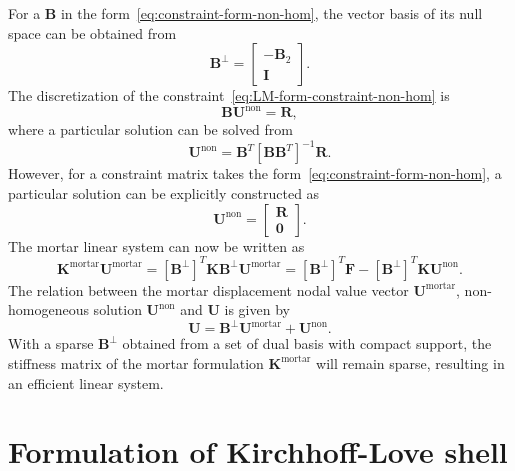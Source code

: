 For a $\mathbf{B}$ in the form~\eqref{eq:constraint-form-non-hom}, the vector basis of its null space can be obtained from
\begin{equation}
	\mathbf{B}^\perp=\begin{bmatrix}
		-\mathbf{B}_2 \\
		\mathbf{I}
	\end{bmatrix}.
	\label{eq:null-space-non-hom}
\end{equation}
The discretization of the constraint~\eqref{eq:LM-form-constraint-non-hom} is
\begin{equation}
	\mathbf{B}\mathbf{U}^\text{non} = \mathbf{R},
\end{equation}
where a particular solution can be solved from~\cite{ainsworth2001essential}
\begin{equation}
	\mathbf{U}^\text{non} = \mathbf{B}^T\left[ \mathbf{B}\mathbf{B}^T \right]^{-1}\mathbf{R}.
\end{equation}
However, for a constraint matrix takes the form~\eqref{eq:constraint-form-non-hom}, a particular solution can be explicitly constructed as
\begin{equation}
	\mathbf{U}^\text{non} = \begin{bmatrix}
		\mathbf{R} \\\mathbf{0}
	\end{bmatrix}.\label{eq:dual_particular_solution}
\end{equation}
The mortar linear system can now be written as
\begin{equation}
	\mathbf{K}^{\text{mortar}}\mathbf{U}^{\text{mortar}}=\left[\mathbf{B}^\perp\right]^T\mathbf{K}\mathbf{B}^\perp\mathbf{U}^{\text{mortar}}=\left[\mathbf{B}^\perp\right]^T\mathbf{F}-\left[\mathbf{B}^\perp\right]^T\mathbf{K}\mathbf{U}^\text{non}.\label{eq:mortar-form-discretized}
\end{equation}
The relation between the mortar displacement nodal value vector $\mathbf{U}^{\text{mortar}}$, non-homogeneous solution $\mathbf{U}^\text{non}$ and $\mathbf{U}$ is given by
\begin{equation}
	\mathbf{U}=\mathbf{B}^\perp\mathbf{U}^{\text{mortar}}+\mathbf{U}^\text{non}.
\end{equation}
With a sparse $\mathbf{B}^\perp$ obtained from a set of dual basis with compact support, the stiffness matrix of the mortar formulation $\mathbf{K}^{\text{mortar}}$ will remain sparse, resulting in an efficient linear system.

\section{Formulation of Kirchhoff-Love shell}\label{sec:formulation}

